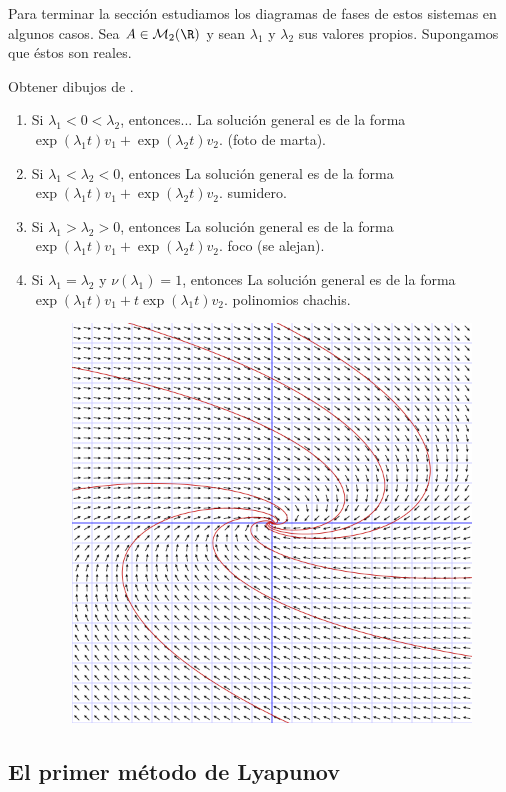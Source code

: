 Para terminar la sección estudiamos los diagramas de fases de estos sistemas en algunos casos. Sea
$A \in \mathcal{M}_2(\R)$ y sean $\lambda_1$ y $\lambda_2$ sus valores propios. Supongamos que éstos
son reales.

Obtener dibujos de .

\begin{enumerate}
\item Si $\lambda_1 < 0 < \lambda_2$, entonces... La solución general es de la forma
  $\exp(\lambda_1 t) v_1 + \exp(\lambda_2 t) v_2$. (foto de marta).
\item Si $\lambda_1 < \lambda_2 < 0$, entonces La solución general es de la forma
  $\exp(\lambda_1 t) v_1 + \exp(\lambda_2 t) v_2$. sumidero.
\item Si $\lambda_1 > \lambda_2 > 0$, entonces La solución general es de la forma
  $\exp(\lambda_1 t) v_1 + \exp(\lambda_2 t) v_2$. foco (se alejan).
\item Si $\lambda_1 = \lambda_2$ y $\nu(\lambda_1) = 1$, entonces La solución general es de la forma
  $\exp(\lambda_1 t) v_1 + t\exp(\lambda_1 t) v_2$. polinomios chachis.
  \begin{figure}[H]
    \centering
    \includegraphics[width=.7\textwidth]{./images/fases-pols.png}
  \end{figure}
\end{enumerate}

\subsection{El primer método de Lyapunov}

